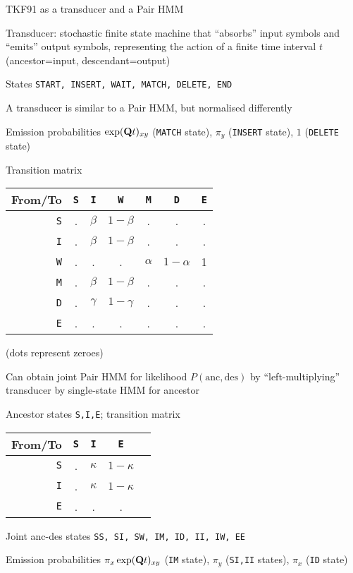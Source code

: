 \documentclass{beamer}
\begin{document}
\begin{frame}{}
TKF91 as a transducer and a Pair HMM
 \itemb
 \item Transducer: stochastic finite state machine that ``absorbs'' input symbols and ``emits'' output symbols,
representing the action of a finite time interval $t$ (ancestor=input, descendant=output)
  \itemb
  \item States {\tt START, INSERT, WAIT, MATCH, DELETE, END}
  \item A transducer is similar to a Pair HMM, but normalised differently
  \item Emission probabilities $\exp({\bf Q}t)_{xy}$ ({\tt MATCH} state), $\pi_y$ ({\tt INSERT} state), $1$ ({\tt DELETE} state)
  \iteme
 \iteme
\end{frame}

\begin{frame}{}
Transition matrix
\begin{tabular}{r|cccccc}
From/To & {\tt S} & {\tt I} & {\tt W} & {\tt M} & {\tt D} & {\tt E} \\
\hline
{\tt S} & . & $\beta$ & $1-\beta$ & . & . & . \\
{\tt I} & . & $\beta$ & $1-\beta$ & . & . & . \\
{\tt W} & . & . & . & $\alpha$ & $1-\alpha$ & 1 \\
{\tt M} & . & $\beta$ & $1-\beta$ & . & . & . \\
{\tt D} & . & $\gamma$ & $1-\gamma$ & . & . & . \\
{\tt E} & . & . & . & . & . & .
\end{tabular}
(dots represent zeroes)
\end{frame}

\begin{frame}{}
Can obtain joint Pair HMM for likelihood $P(\mbox{anc},\mbox{des})$ by ``left-multiplying'' transducer by single-state HMM for ancestor
  \itemb
  \item Ancestor states {\tt S,I,E}; transition matrix
\begin{tabular}{r|cccc}
From/To & {\tt S} & {\tt I} & {\tt E} \\
\hline
{\tt S} & . & $\kappa$ & $1-\kappa$ \\
{\tt I} & . & $\kappa$ & $1-\kappa$ \\
{\tt E} & . & . & .
\end{tabular}
  \item Joint anc-des states {\tt SS, SI, SW, IM, ID, II, IW, EE}
  \item Emission probabilities $\pi_x \exp({\bf Q}t)_{xy}$ ({\tt IM} state), $\pi_y$ ({\tt SI,II} states), $\pi_x$ ({\tt ID} state)
 \iteme
\end{frame}
\end{document}
